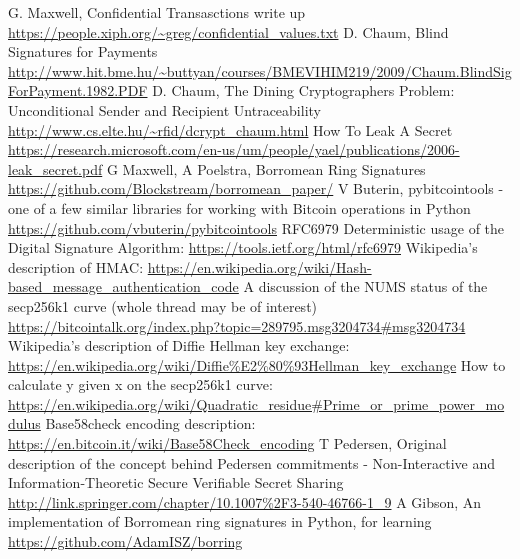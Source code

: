 \documentclass[10pt,a4paper]{article}
\begin{document}
 \begin{thebibliography}{33}

   G. Maxwell, Confidential Transasctions write up \url{https://people.xiph.org/~greg/confidential_values.txt}
   D. Chaum, Blind Signatures for Payments \url{http://www.hit.bme.hu/~buttyan/courses/BMEVIHIM219/2009/Chaum.BlindSigForPayment.1982.PDF}
   D. Chaum, The Dining Cryptographers Problem: Unconditional Sender and Recipient Untraceability \url{http://www.cs.elte.hu/~rfid/dcrypt_chaum.html}
   How To Leak A Secret \url{https://research.microsoft.com/en-us/um/people/yael/publications/2006-leak_secret.pdf}
   G Maxwell, A Poelstra, Borromean Ring Signatures \url{https://github.com/Blockstream/borromean_paper/}
   V Buterin, pybitcointools - one of a few similar libraries for working with Bitcoin operations in Python  \url{https://github.com/vbuterin/pybitcointools}
   RFC6979 Deterministic usage of the Digital Signature Algorithm: \url{https://tools.ietf.org/html/rfc6979}
   Wikipedia's description of HMAC: \url{https://en.wikipedia.org/wiki/Hash-based_message_authentication_code}
   A discussion of the NUMS status of the secp256k1 curve (whole thread may be of interest) \url{https://bitcointalk.org/index.php?topic=289795.msg3204734#msg3204734}
   Wikipedia's description of Diffie Hellman key exchange: \url{https://en.wikipedia.org/wiki/Diffie%E2%80%93Hellman_key_exchange}
   How to calculate y given x on the secp256k1 curve: \url{https://en.wikipedia.org/wiki/Quadratic_residue#Prime_or_prime_power_modulus}
   Base58check encoding description: \url{https://en.bitcoin.it/wiki/Base58Check_encoding}
   T Pedersen, Original description of the concept behind Pedersen commitments - Non-Interactive and Information-Theoretic Secure Verifiable Secret Sharing  \url{http://link.springer.com/chapter/10.1007%2F3-540-46766-1_9}
   A Gibson, An implementation of Borromean ring signatures in Python, for learning \url{https://github.com/AdamISZ/borring}
  \end{thebibliography}
\end{document}
